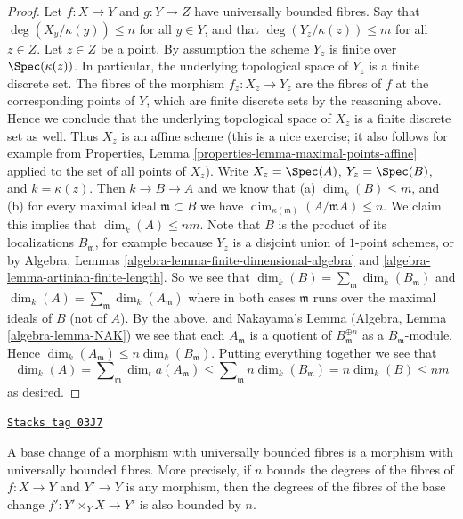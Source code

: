 \begin{proof}
Let $f : X \to Y$ and $g : Y \to Z$ have universally bounded fibres.
Say that $\deg(X_y/\kappa(y)) \leq n$ for all $y \in Y$, and that
$\deg(Y_z/\kappa(z)) \leq m$ for all $z \in Z$.
Let $z \in Z$ be a point. By assumption the scheme
$Y_z$ is finite over $\Spec(\kappa(z))$.
In particular, the underlying topological space of $Y_z$
is a finite discrete set. The fibres of the morphism
$f_z : X_z \to Y_z$ are the fibres of $f$ at the corresponding
points of $Y$, which are finite discrete sets by the reasoning above.
Hence we conclude that the underlying topological space
of $X_z$ is a finite discrete set as well. Thus $X_z$ is an affine
scheme (this is a nice exercise; it also follows for example from
Properties, Lemma \ref{properties-lemma-maximal-points-affine}
applied to the set of all points of $X_z$). Write $X_z = \Spec(A)$,
$Y_z = \Spec(B)$, and $k = \kappa(z)$. Then $k \to B \to A$
and we know that (a) $\dim_k(B) \leq m$, and (b) for every maximal
ideal $\mathfrak m \subset B$ we have
$\dim_{\kappa(\mathfrak m)}(A/\mathfrak mA) \leq n$.
We claim this implies that $\dim_k(A) \leq nm$.
Note that $B$ is the product of its localizations $B_{\mathfrak m}$, for
example because $Y_z$ is a disjoint union of $1$-point schemes, or by
Algebra, Lemmas \ref{algebra-lemma-finite-dimensional-algebra} and
\ref{algebra-lemma-artinian-finite-length}.
So we see that
$\dim_k(B) = \sum_{\mathfrak m} \dim_k(B_{\mathfrak m})$ and
$\dim_k(A) = \sum_{\mathfrak m} \dim_k(A_{\mathfrak m})$ where
in both cases $\mathfrak m$ runs over the maximal ideals of
$B$ (not of $A$). By the above, and Nakayama's Lemma
(Algebra, Lemma \ref{algebra-lemma-NAK})
we see that each $A_{\mathfrak m}$ is a quotient of
$B_{\mathfrak m}^{\oplus n}$ as a $B_{\mathfrak m}$-module. Hence
$\dim_k(A_{\mathfrak m}) \leq n \dim_k(B_{\mathfrak m})$. Putting
everything together we see that
$$
\dim_k(A) = \sum\nolimits_{\mathfrak m} \dim_ta	(A_{\mathfrak m})
\leq \sum\nolimits_{\mathfrak m} n \dim_k(B_{\mathfrak m})
= n \dim_k(B) \leq nm
$$
as desired.
\end{proof}

\begin{lemma}
\label{morphisms-lemma-base-change-universally-bounded}
\href{https://stacks.math.columbia.edu/tag/03J7}{\texttt{Stacks tag 03J7}}

A base change of a morphism with universally bounded fibres is
a morphism with universally bounded fibres. More precisely, if
$n$ bounds the degrees of the fibres of $f : X \to Y$ and $Y' \to Y$
is any morphism, then the degrees of the fibres of the base change
$f' : Y' \times_Y X \to Y'$ is also bounded by $n$.
\end{lemma}

